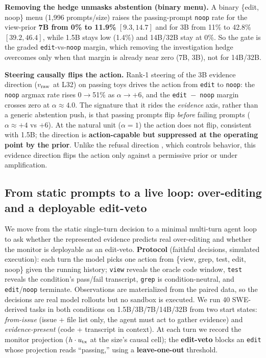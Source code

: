 \documentclass[
  11pt,
  a4paper]{article}
\begin{document}
\textbf{Removing the hedge unmasks abstention (binary menu).} A binary
\{edit, noop\} menu (1,996 prompts/size) raises the passing-prompt
\texttt{noop} rate for the view-prior \textbf{7B from 0\% to 11.9\%}
\([9.3,14.7]\) and for 3B from 11\% to 42.8\% \([39.2,46.4]\), while
1.5B stays low (1.4\%) and 14B/32B stay at 0\%. So the gate is the
graded \texttt{edit}-vs-\texttt{noop} margin, which removing the
investigation hedge overcomes only when that margin is already near zero
(7B, 3B), not for 14B/32B.

\textbf{Steering causally flips the action.} Rank-1 steering of the 3B
evidence direction (\(v_{\rm raw}\) at L32) on passing toys drives the
action from \texttt{edit} to \texttt{noop}: the \texttt{noop} argmax
rate rises 0\ensuremath{\rightarrow}51\% as \(\alpha\to+6\), and the \texttt{edit\ \ensuremath{-}\ noop}
margin crosses zero at \(\alpha\approx 4.0\). The signature that it
rides the \emph{evidence} axis, rather than a generic abstention push,
is that passing prompts flip \emph{before} failing prompts
(\(\alpha\approx+4\) vs \(+6\)). At the natural unit (\(\alpha=1\)) the
action does not flip, consistent with 1.5B; the direction is
\textbf{action-capable but suppressed at the operating point by the
prior}. Unlike the refusal direction \citep{arditi2024refusal}, which
controls behavior, this evidence direction flips the action only against
a permissive prior or under amplification.

\subsection{From static prompts to a live loop: over-editing and a
deployable
edit-veto}\label{from-static-prompts-to-a-live-loop-over-editing-and-a-deployable-edit-veto}

We move from the static single-turn decision to a minimal multi-turn
agent loop to ask whether the represented evidence predicts real
over-editing and whether the monitor is deployable as an edit-veto.
\textbf{Protocol} (faithful decisions, simulated execution): each turn
the model picks one action from \{view, grep, test, edit, noop\} given
the running history; \texttt{view} reveals the oracle code window,
\texttt{test} reveals the condition's pass/fail transcript,
\texttt{grep} is condition-neutral, and \texttt{edit}/\texttt{noop}
terminate. Observations are materialized from the paired data, so the
decisions are real model rollouts but no sandbox is executed. We run 40
SWE-derived tasks in both conditions on 1.5B/3B/7B/14B/32B from two
start states: \emph{from-issue} (issue + file list only, the agent must
act to gather evidence) and \emph{evidence-present} (code + transcript
in context). At each turn we record the monitor projection
(\(h\cdot u_{\rm tx}\) at the size's causal cell); the
\textbf{edit-veto} blocks an \texttt{edit} whose projection reads
``passing,'' using a \textbf{leave-one-out} threshold.
\end{document}
